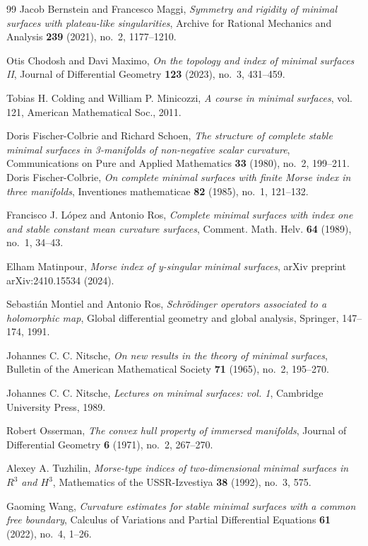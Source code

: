 \documentclass[11pt]{amsart}
\numberwithin{equation}{section}
\theoremstyle{theorem}
\theoremstyle{definition}
\numberwithin{equation}{section}
\begin{document}
\begin{thebibliography}{99}
Jacob Bernstein and Francesco Maggi, \emph{Symmetry and rigidity of minimal surfaces with plateau-like singularities}, Archive for Rational Mechanics and Analysis \textbf{239} (2021), no.~2, 1177--1210.

Otis Chodosh and Davi Maximo, \emph{On the topology and index of minimal surfaces II}, Journal of Differential Geometry \textbf{123} (2023), no.~3, 431--459.

Tobias H. Colding and William P. Minicozzi, \emph{A course in minimal surfaces}, vol. 121, American Mathematical Soc., 2011.

Doris Fischer-Colbrie and Richard Schoen, \emph{The structure of complete stable minimal surfaces in 3-manifolds of non-negative scalar curvature}, Communications on Pure and Applied Mathematics \textbf{33} (1980), no.~2, 199--211.
Doris Fischer-Colbrie, \emph{On complete minimal surfaces with finite Morse index in three manifolds}, Inventiones mathematicae \textbf{82} (1985), no.~1, 121--132.

Francisco J. López and Antonio Ros, \emph{Complete minimal surfaces with index one and stable constant mean curvature surfaces}, Comment. Math. Helv. \textbf{64} (1989), no.~1, 34--43.

Elham Matinpour, \emph{Morse index of y-singular minimal surfaces}, arXiv preprint arXiv:2410.15534 (2024).

Sebastián Montiel and Antonio Ros, \emph{Schrödinger operators associated to a holomorphic map}, Global differential geometry and global analysis, Springer, 147--174, 1991.

Johannes C. C. Nitsche, \emph{On new results in the theory of minimal surfaces}, Bulletin of the American Mathematical Society \textbf{71} (1965), no.~2, 195--270.

Johannes C. C. Nitsche, \emph{Lectures on minimal surfaces: vol. 1}, Cambridge University Press, 1989.

Robert Osserman, \emph{The convex hull property of immersed manifolds}, Journal of Differential Geometry \textbf{6} (1971), no.~2, 267--270.

Alexey A. Tuzhilin, \emph{Morse-type indices of two-dimensional minimal surfaces in $R^3$ and $H^3$}, Mathematics of the USSR-Izvestiya \textbf{38} (1992), no.~3, 575.

Gaoming Wang, \emph{Curvature estimates for stable minimal surfaces with a common free boundary}, Calculus of Variations and Partial Differential Equations \textbf{61} (2022), no.~4, 1--26.

\end{thebibliography}
\end{document}
